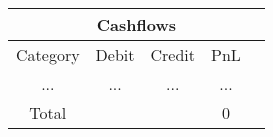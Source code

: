 \begin{longtable}{|c|c|c|c|c|}
\hline
\multicolumn{5}{|c|}{Cashflows} \\
\hline
Category & Debit & Credit & PnL \\
\hline
 ... & ... & ... & ...\\
\hline
 Total &  &  & 0 \\
\hline
\end{longtable}
